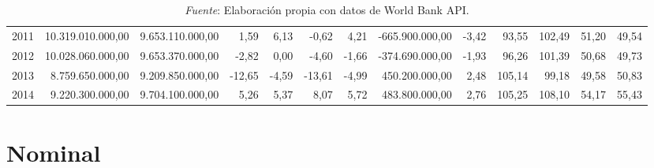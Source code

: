 \documentclass[a4paper,openright,12pt]{book}
\begin{document}
\begin{table}
{\begin{tabular}{lrrrrrrrrrrrr}
    2011 &                     10.319.010.000,00 &                      9.653.110.000,00 &                                          1,59 &                                          6,13 &                                      -0,62 &                                       4,21 &        -665.900.000,00 &                    -3,42 &                  93,55 &                102,49 &                                 51,20 &                   49,54 \\
    2012 &                     10.028.060.000,00 &                      9.653.370.000,00 &                                         -2,82 &                                          0,00 &                                      -4,60 &                                      -1,66 &        -374.690.000,00 &                    -1,93 &                  96,26 &                101,39 &                                 50,68 &                   49,73 \\
    2013 &                      8.759.650.000,00 &                      9.209.850.000,00 &                                        -12,65 &                                         -4,59 &                                     -13,61 &                                      -4,99 &         450.200.000,00 &                     2,48 &                 105,14 &                 99,18 &                                 49,58 &                   50,83 \\
    2014 &                      9.220.300.000,00 &                      9.704.100.000,00 &                                          5,26 &                                          5,37 &                                       8,07 &                                       5,72 &         483.800.000,00 &                     2,76 &                 105,25 &                108,10 &                                 54,17 &                   55,43 \\

    \bottomrule
\end{tabular}}
\caption*{\textit{Fuente}: Elaboración propia con datos de World Bank API.}
\end{table}

\section{Nominal}
\end{document}
